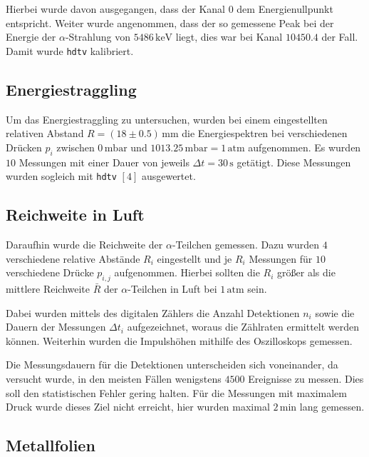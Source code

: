 \documentclass[12pt,a4paper]{scrartcl}
\numberwithin{equation}{section} %
\renewcommand{\[}{} %
\renewcommand{\]}{\noindent} %
\begin{document}
Hierbei wurde davon ausgegangen, dass der Kanal \(0\) dem
Energienullpunkt entspricht. Weiter wurde angenommen, dass der so
gemessene Peak bei der Energie der \(\alpha\)-Strahlung von
\(5486\mathrm{\,keV}\) liegt, dies war bei Kanal \(10450.4\) der Fall.
Damit wurde \texttt{hdtv} kalibriert.

\hypertarget{energiestraggling}{%
\subsection{Energiestraggling}\label{energiestraggling}}

Um das Energiestraggling zu untersuchen, wurden bei einem eingestellten
relativen Abstand \(R=(18\pm 0.5)\mathrm{\,mm}\) die Energiespektren bei
verschiedenen Drücken \(p_i\) zwischen \(0\mathrm{\,mbar}\) und
\(1013.25\mathrm{\,mbar}=1\mathrm{\,atm}\) aufgenommen. Es wurden \(10\)
Messungen mit einer Dauer von jeweils \(\Delta t=30\mathrm{\,s}\)
getätigt. Diese Messungen wurden sogleich mit \texttt{hdtv} \([4]\)
ausgewertet.

\hypertarget{reichweite-in-luft}{%
\subsection{Reichweite in Luft}\label{reichweite-in-luft}}

Daraufhin wurde die Reichweite der \(\alpha\)-Teilchen gemessen. Dazu
wurden \(4\) verschiedene relative Abstände \(R_i\) eingestellt und je
\(R_i\) Messungen für \(10\) verschiedene Drücke \(p_{i,j}\)
aufgenommen. Hierbei sollten die \(R_i\) größer als die mittlere
Reichweite \(\bar R\) der \(\alpha\)-Teilchen in Luft bei
\(1\mathrm{\,atm}\) sein.

Dabei wurden mittels des digitalen Zählers die Anzahl Detektionen
\(n_i\) sowie die Dauern der Messungen \(\Delta t_i\) aufgezeichnet,
woraus die Zählraten ermittelt werden können. Weiterhin wurden die
Impulshöhen mithilfe des Oszilloskops gemessen.

Die Messungsdauern für die Detektionen unterscheiden sich voneinander,
da versucht wurde, in den meisten Fällen wenigstens \(4500\) Ereignisse
zu messen. Dies soll den statistischen Fehler gering halten. Für die
Messungen mit maximalem Druck wurde dieses Ziel nicht erreicht, hier
wurden maximal \(2\mathrm{\,min}\) lang gemessen.

\hypertarget{metallfolien}{%
\subsection{Metallfolien}\label{metallfolien}}
\end{document}
